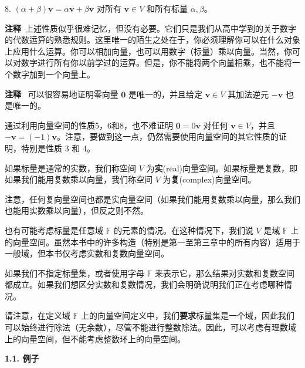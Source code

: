 8. $(\alpha + \beta) \mathbf{v} = \alpha \mathbf{v} + \beta \mathbf{v}$ 对所有 $\mathbf{v} \in V$ 和所有标量 $\alpha, \beta$。

 \textbf{注释}~上述性质似乎很难记忆，但没有必要。它们只是我们从高中学到的关于数字的代数运算的熟悉规则。这里唯一的陌生之处在于，你必须理解你可以在什么对象上应用什么运算。你可以相加向量，也可以用数字（标量）乘以向量。当然，你可以对数字进行所有你以前学过的运算。但是，你不能将两个向量相乘，也不能将一个数字加到一个向量上。

\textbf{注释} ~可以很容易地证明零向量 $\mathbf{0}$ 是唯一的，并且给定 $\mathbf{v} \in V$ 其加法逆元 $-\mathbf{v}$ 也是唯一的。

通过利用向量空间的性质5，6和8，也不难证明 $\mathbf{0} = 0 \mathbf{v}$ 对任何 $\mathbf{v} \in V$，并且 $-\mathbf{v} = (-1)\mathbf{v}$。注意，要做到这一点，仍然需要使用向量空间的其它性质的证明，特别是性质 3 和 4。


如果标量是通常的实数，我们称空间 $V$ 为\textbf{实}(real)向量空间。如果标量是复数，即如果我们能用复数乘以向量，我们称空间 $V$ 为\textbf{复}(complex)向量空间。

注意，任何复向量空间也都是实向量空间（如果我们能用复数乘以向量，那么我们也能用实数乘以向量），但反之则不然。

也有可能考虑标量是任意域 $\mathbb{F}$ 的元素的情况。在这种情况下，我们说 $V$ 是域 $\mathbb{F}$ 上的向量空间。虽然本书中的许多构造（特别是第一至第三章中的所有内容）适用于一般域，但本书仅考虑实数和复数向量空间。

如果我们不指定标量集，或者使用字母 $\mathbb{F}$ 来表示它，那么结果对实数和复数空间都成立。如果我们想区分实数和复数情况，我们会明确说明我们正在考虑哪种情况。

请注意，在定义域 $\mathbb{F}$ 上的向量空间定义中，我们\textbf{要求}标量集是一个域，因此我们可以始终进行除法（无余数），尽管不能进行整数除法。因此，可以考虑有理数域上的向量空间，但不能考虑整数环上的向量空间。





\textbf{1.1. 例子}

